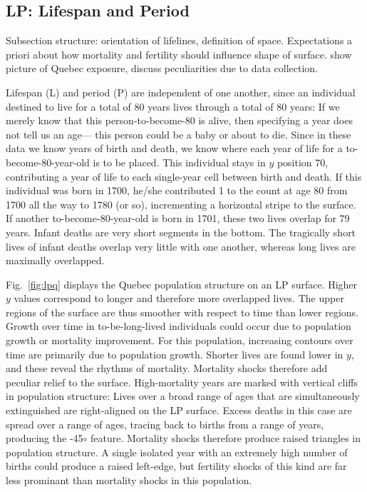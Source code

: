 \subsection{LP: Lifespan and Period}



Subsection structure: orientation of lifelines, definition of space.
Expectations a priori about how mortality and fertility should influence shape of surface. show picture of Quebec exposure, discuss peculiarities due to data collection.

Lifespan (L) and period (P) are independent of one another, since an individual destined to live for a total of 80 years lives through a total of 80 years: If we merely know that this person-to-become-80 is alive, then specifying a year does not tell us an age--- this person could be a baby or about to die. Since in these data we know years of birth and death, we know where each year of life for a to-become-80-year-old is to be placed. This individual stays in $y$ position 70, contributing a year of life to each single-year cell between birth and death. If this individual was born in 1700, he/she contributed 1 to
the count at age 80 from 1700 all the way to 1780 (or so), incrementing a horizontal stripe to the surface. If another to-become-80-year-old is born in 1701, these two lives overlap for 79 years. Infant deaths are very short segments in the bottom. The tragically short lives of infant deaths overlap very little with one another, whereas long lives are maximally overlapped.

Fig.~\ref{fig:lpq} displays the Quebec population structure on an LP surface. Higher $y$ values correspond to longer and therefore more overlapped lives. The upper regions of the surface are thus smoother with respect to time than lower regions. Growth over time in to-be-long-lived individuals could occur due to population growth or mortality improvement. For this population, increasing contours over time are primarily due to population growth. Shorter lives are found lower in $y$, and these reveal the rhythms of mortality. Mortality shocks therefore add peculiar relief to the surface. High-mortality years are
marked with vertical cliffs in population structure: Lives over a broad range of ages that are simultaneously extinguished are right-aligned on the LP surface. Excess deaths in this case are spread over a range of ages, tracing back to births from a range of years, producing the -45$\circ$ feature. Mortality shocks therefore produce raised triangles in population structure. A single isolated year with an extremely high number of births could produce a raised left-edge, but fertility shocks of this kind are far less prominant than mortality shocks in this population.

